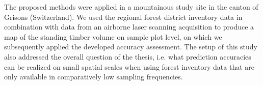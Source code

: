 The proposed methods were applied in a mountainous study site in the canton of Grisons (Switzerland). We used the regional forest district inventory data in combination with data from an airborne laser scanning acquisition to produce a map of the standing timber volume on sample plot level, on which we subsequently applied the developed accuracy assessment. The setup of this study also addressed the overall question of the thesis, i.e. what prediction accuracies can be realized on small spatial scales when using forest inventory data that are only available in comparatively low sampling frequencies.


